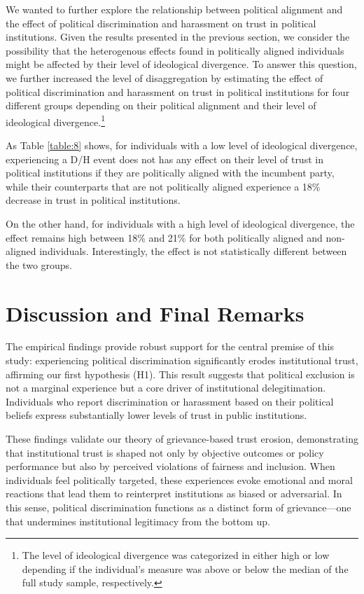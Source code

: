 \documentclass{article}
\begin{document}
We wanted to further explore the relationship between political alignment and the effect of political discrimination and harassment on trust in political institutions. Given the results presented in the previous section, we consider the possibility that the heterogenous effects found in politically aligned individuals might be affected by their level of ideological divergence. To answer this question, we further increased the level of disaggregation by estimating the effect of political discrimination and harassment on trust in political institutions for four different groups depending on their political alignment and their level of ideological divergence.\footnote{The level of ideological divergence was categorized in either high or low depending if the individual's measure was above or below the median of the full study sample, respectively.}

As Table \ref{table:8} shows, for individuals with a low level of ideological divergence, experiencing a D/H event does not has any effect on their level of trust in political institutions if they are politically aligned with the incumbent party, while their counterparts that are not politically aligned experience a 18\% decrease in trust in political institutions.

On the other hand, for individuals with a high level of ideological divergence, the effect remains high between 18\% and 21\% for both politically aligned and non-aligned individuals. Interestingly, the effect is not statistically different between the two groups.

\section{Discussion and Final Remarks}

The empirical findings provide robust support for the central premise of this study: experiencing political discrimination significantly erodes institutional trust, affirming our first hypothesis (H1). This result suggests that political exclusion is not a marginal experience but a core driver of institutional delegitimation. Individuals who report discrimination or harassment based on their political beliefs express substantially lower levels of trust in public institutions.

These findings validate our theory of grievance-based trust erosion, demonstrating that institutional trust is shaped not only by objective outcomes or policy performance but also by perceived violations of fairness and inclusion. When individuals feel politically targeted, these experiences evoke emotional and moral reactions that lead them to reinterpret institutions as biased or adversarial. In this sense, political discrimination functions as a distinct form of grievance—one that undermines institutional legitimacy from the bottom up.
\end{document}
